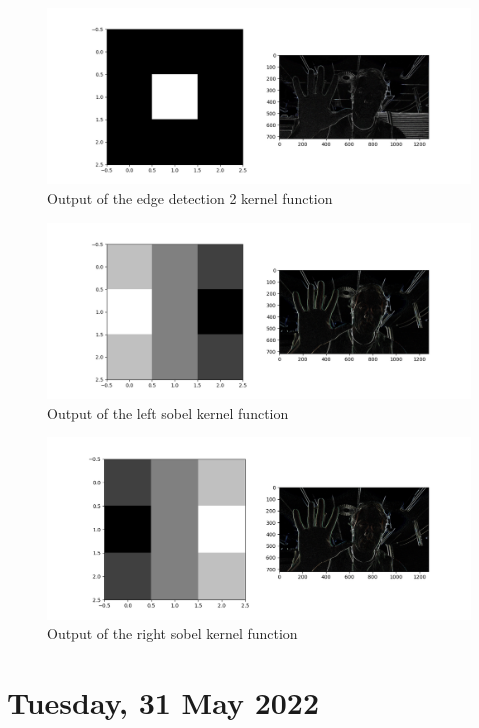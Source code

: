 \begin{figure}[h]
    \centering
    \includegraphics[width=0.9\linewidth]{figures/kernel_edge_detection_2.png}
    \caption{Output of the edge detection 2 kernel function}
    \label{fig:kernel_edge_detection_2}
\end{figure}

\begin{figure}[h]
    \centering
    \includegraphics[width=0.9\linewidth]{figures/kernel_left_sobel.png}
    \caption{Output of the left sobel kernel function}
    \label{fig:kernel_left_sobel}
\end{figure}

\begin{figure}[h]
    \centering
    \includegraphics[width=0.9\linewidth]{figures/kernel_right_sobel.png}
    \caption{Output of the right sobel kernel function}
    \label{fig:kernel_right_sobel}
\end{figure}

\section[2022/05/31]{Tuesday, 31 May 2022}

